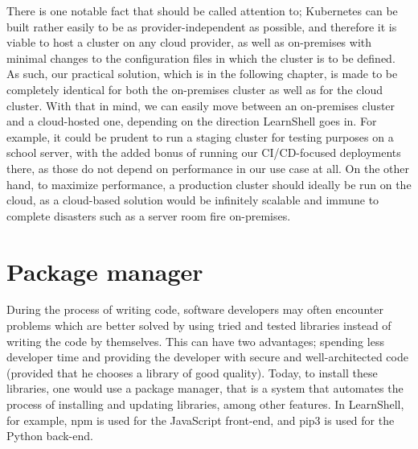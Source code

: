 \documentclass[thesis=B,english]{FITthesis}[2019/12/23]
\begin{document}
There is one notable fact that should be called attention to; Kubernetes can be built rather easily to be as provider-independent as possible, and therefore it is viable to host a cluster on any cloud provider, as well as on-premises with minimal changes to the configuration files in which the cluster is to be defined. As such, our practical solution, which is in the following chapter, is made to be completely identical for both the on-premises cluster as well as for the cloud cluster. 
With that in mind, we can easily move between an on-premises cluster and a cloud-hosted one, depending on the direction LearnShell goes in. For example, it could be prudent to run a staging cluster for testing purposes on a school server, with the added bonus of running our CI/CD-focused deployments there, as those do not depend on performance in our use case at all. On the other hand, to maximize performance, a production cluster should ideally be run on the cloud, as a cloud-based solution would be infinitely scalable and immune to complete disasters such as a server room fire on-premises. 

\section{Package manager}

During the process of writing code, software developers may often encounter problems which are better solved by using tried and tested libraries instead of writing the code by themselves. This can have two advantages; spending less developer time and providing the developer with secure and well-architected code (provided that he chooses a library of good quality). Today, to install these libraries, one would use a package manager, that is a system that automates the process of installing and updating libraries, among other features. In LearnShell, for example, npm is used for the JavaScript front-end, and pip3 is used for the Python back-end.
\end{document}
